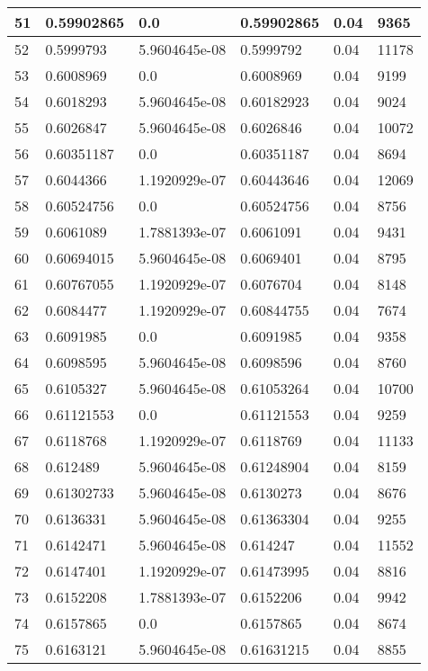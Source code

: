 \begin{longtable}{|l|l|l|l|l|l|}
51 & 0.59902865 & 0.0 & 0.59902865 & 0.04 & 9365 \\ \hline 
52 & 0.5999793 & 5.9604645e-08 & 0.5999792 & 0.04 & 11178 \\ \hline 
53 & 0.6008969 & 0.0 & 0.6008969 & 0.04 & 9199 \\ \hline 
54 & 0.6018293 & 5.9604645e-08 & 0.60182923 & 0.04 & 9024 \\ \hline 
55 & 0.6026847 & 5.9604645e-08 & 0.6026846 & 0.04 & 10072 \\ \hline 
56 & 0.60351187 & 0.0 & 0.60351187 & 0.04 & 8694 \\ \hline 
57 & 0.6044366 & 1.1920929e-07 & 0.60443646 & 0.04 & 12069 \\ \hline 
58 & 0.60524756 & 0.0 & 0.60524756 & 0.04 & 8756 \\ \hline 
59 & 0.6061089 & 1.7881393e-07 & 0.6061091 & 0.04 & 9431 \\ \hline 
60 & 0.60694015 & 5.9604645e-08 & 0.6069401 & 0.04 & 8795 \\ \hline 
61 & 0.60767055 & 1.1920929e-07 & 0.6076704 & 0.04 & 8148 \\ \hline 
62 & 0.6084477 & 1.1920929e-07 & 0.60844755 & 0.04 & 7674 \\ \hline 
63 & 0.6091985 & 0.0 & 0.6091985 & 0.04 & 9358 \\ \hline 
64 & 0.6098595 & 5.9604645e-08 & 0.6098596 & 0.04 & 8760 \\ \hline 
65 & 0.6105327 & 5.9604645e-08 & 0.61053264 & 0.04 & 10700 \\ \hline 
66 & 0.61121553 & 0.0 & 0.61121553 & 0.04 & 9259 \\ \hline 
67 & 0.6118768 & 1.1920929e-07 & 0.6118769 & 0.04 & 11133 \\ \hline 
68 & 0.612489 & 5.9604645e-08 & 0.61248904 & 0.04 & 8159 \\ \hline 
69 & 0.61302733 & 5.9604645e-08 & 0.6130273 & 0.04 & 8676 \\ \hline 
70 & 0.6136331 & 5.9604645e-08 & 0.61363304 & 0.04 & 9255 \\ \hline 
71 & 0.6142471 & 5.9604645e-08 & 0.614247 & 0.04 & 11552 \\ \hline 
72 & 0.6147401 & 1.1920929e-07 & 0.61473995 & 0.04 & 8816 \\ \hline 
73 & 0.6152208 & 1.7881393e-07 & 0.6152206 & 0.04 & 9942 \\ \hline 
74 & 0.6157865 & 0.0 & 0.6157865 & 0.04 & 8674 \\ \hline 
75 & 0.6163121 & 5.9604645e-08 & 0.61631215 & 0.04 & 8855 \\ \hline 
\end{longtable}